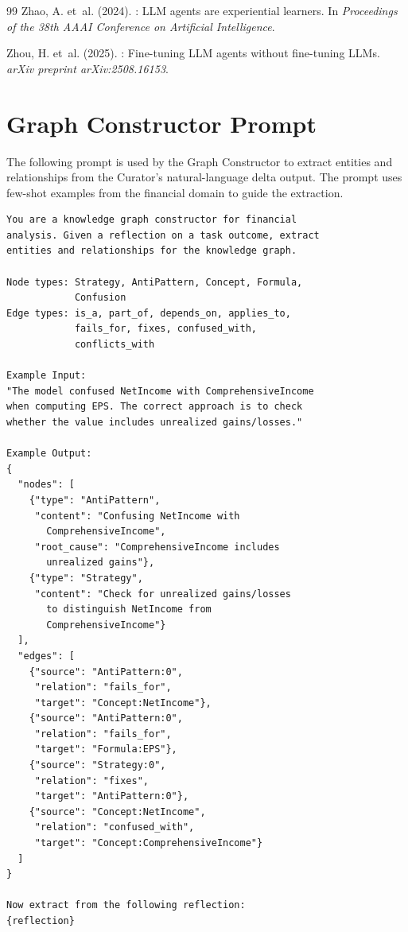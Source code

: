 \documentclass[12pt,a4paper,oneside]{article}
\begin{document}
\begin{thebibliography}{99}
Zhao, A. et~al. (2024).
: {LLM} agents are experiential learners.
\newblock In \textit{Proceedings of the 38th AAAI Conference on Artificial Intelligence}.

Zhou, H. et~al. (2025).
: Fine-tuning {LLM} agents without fine-tuning {LLMs}.
\newblock \textit{arXiv preprint arXiv:2508.16153}.

\end{thebibliography}

\newpage
\appendix
{}

\section{Graph Constructor Prompt}
\label{app:prompt}

The following prompt is used by the Graph Constructor to extract entities and relationships from the Curator's natural-language delta output. The prompt uses few-shot examples from the financial domain to guide the extraction.

\begin{lstlisting}[caption={Graph Constructor LLM prompt for entity and relationship extraction.}]
You are a knowledge graph constructor for financial
analysis. Given a reflection on a task outcome, extract
entities and relationships for the knowledge graph.

Node types: Strategy, AntiPattern, Concept, Formula,
            Confusion
Edge types: is_a, part_of, depends_on, applies_to,
            fails_for, fixes, confused_with,
            conflicts_with

Example Input:
"The model confused NetIncome with ComprehensiveIncome
when computing EPS. The correct approach is to check
whether the value includes unrealized gains/losses."

Example Output:
{
  "nodes": [
    {"type": "AntiPattern",
     "content": "Confusing NetIncome with
       ComprehensiveIncome",
     "root_cause": "ComprehensiveIncome includes
       unrealized gains"},
    {"type": "Strategy",
     "content": "Check for unrealized gains/losses
       to distinguish NetIncome from
       ComprehensiveIncome"}
  ],
  "edges": [
    {"source": "AntiPattern:0",
     "relation": "fails_for",
     "target": "Concept:NetIncome"},
    {"source": "AntiPattern:0",
     "relation": "fails_for",
     "target": "Formula:EPS"},
    {"source": "Strategy:0",
     "relation": "fixes",
     "target": "AntiPattern:0"},
    {"source": "Concept:NetIncome",
     "relation": "confused_with",
     "target": "Concept:ComprehensiveIncome"}
  ]
}

Now extract from the following reflection:
{reflection}
\end{lstlisting}
\end{document}
